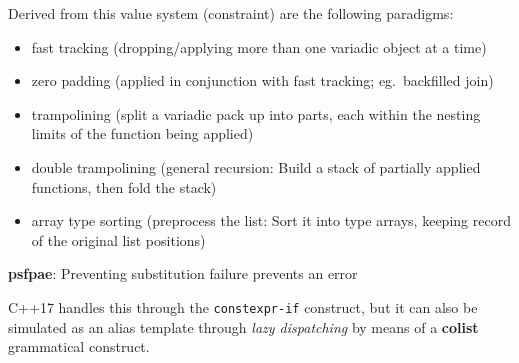 \documentclass[twoside]{article}
\newcommand{\strong}[1]{{\bfseries #1}}
\begin{document}
\begin{minipage}{15cm}
\begin{list}{.}{\setcounter{three}{2}}
	Derived from this value system (constraint) are the following paradigms:

	\begin{itemize}
	\item fast tracking (dropping/applying more than one variadic object at a time)
	\item zero padding (applied in conjunction with fast tracking; eg.~backfilled join)
	\item trampolining (split a variadic pack up into parts, each within the nesting limits of the function being applied)
	\item double trampolining (general recursion: Build a stack of partially applied functions, then fold the stack)
	\item array type sorting (preprocess the list: Sort it into type arrays, keeping record of the original list positions)
	\end{itemize}

\item \strong{psfpae}: Preventing substitution failure prevents an error

	C++17 handles this through the \texttt{constexpr-if} construct, but it can also be simulated as an alias template
	through \emph{lazy dispatching} by means of a \strong{colist} grammatical construct.

\end{list}

\end{minipage}
\newpage
\end{document}
